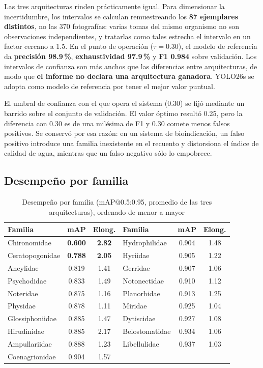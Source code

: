 \documentclass[onecolumn]{article}
\begin{document}
Las tres arquitecturas rinden prácticamente igual. Para dimensionar la incertidumbre, los intervalos se calculan remuestreando los \textbf{87 ejemplares distintos}, no las 370 fotografías: varias tomas del mismo organismo no son observaciones independientes, y tratarlas como tales estrecha el intervalo en un factor cercano a 1.5. En el punto de operación ($\tau=0.30$), el modelo de referencia da \textbf{precisión 98.9\,\%}, \textbf{exhaustividad 97.9\,\%} y \textbf{F1 0.984} sobre validación. Los intervalos de confianza son más anchos que las diferencias entre arquitecturas, de modo que \textbf{el informe no declara una arquitectura ganadora}. YOLO26s se adopta como modelo de referencia por tener el mejor valor puntual.

El umbral de confianza con el que opera el sistema (0.30) se fijó mediante un barrido sobre el conjunto de validación. El valor óptimo resultó 0.25, pero la diferencia con 0.30 es de una milésima de F1 y 0.30 comete menos falsos positivos. Se conservó por esa razón: en un sistema de bioindicación, un falso positivo introduce una familia inexistente en el recuento y distorsiona el índice de calidad de agua, mientras que un falso negativo sólo lo empobrece.

\subsection{Desempeño por familia}

\begin{table}[H]
\centering
\renewcommand{\arraystretch}{1.1}
\small
\caption{Desempeño por familia (mAP@0.5:0.95, promedio de las tres arquitecturas), ordenado de menor a mayor}
\label{tab:familias}
\begin{tabular}{lcc|lcc}
\hline
\textbf{Familia} & \textbf{mAP} & \textbf{Elong.} & \textbf{Familia} & \textbf{mAP} & \textbf{Elong.} \\
\hline
Chironomidae     & \textbf{0.600} & \textbf{2.82} & Hydrophilidae  & 0.904 & 1.48 \\
Ceratopogonidae  & \textbf{0.788} & \textbf{2.05} & Hyriidae       & 0.905 & 1.22 \\
Ancylidae        & 0.819 & 1.41 & Gerridae       & 0.907 & 1.06 \\
Psychodidae      & 0.833 & 1.49 & Notonectidae   & 0.910 & 1.12 \\
Noteridae        & 0.875 & 1.16 & Planorbidae    & 0.913 & 1.25 \\
Physidae         & 0.878 & 1.11 & Miridae        & 0.925 & 1.04 \\
Glossiphoniidae  & 0.885 & 1.47 & Dytiscidae     & 0.927 & 1.08 \\
Hirudinidae      & 0.885 & 2.17 & Belostomatidae & 0.934 & 1.06 \\
Ampullariidae    & 0.888 & 1.23 & Libellulidae   & 0.937 & 1.03 \\
Coenagrionidae   & 0.904 & 1.57 & & & \\
\hline
\end{tabular}
\end{table}
\end{document}
